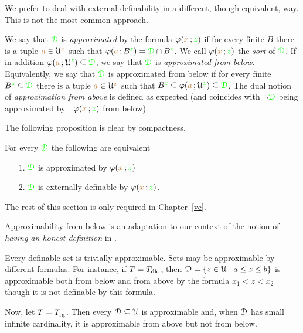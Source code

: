 \noindent\llap{\textcolor{red}{\Large\warning}\kern1.5ex}%
We prefer to deal with external definability in a different, though equivalent, way.
This is not the most common approach.

\begin{definition}\label{def_approx}
We say that ${\color{green}\EuScript D}$ is \emph{approximated\/} by the formula $\varphi({\color{brown} x}\,;{\color{green} z})$ if for every finite $B$ there is a tuple ${\color{brown} a}\in\EuScript U^{\color{brown} x}$ such that $\varphi({\color{brown} a}\,;B^{\color{green} z})={\color{green}\EuScript D}\cap B^{\color{green} z}$.
We call $\varphi({\color{brown} x}\,;{\color{green} z})$ the \emph{sort} of ${\color{green}\EuScript D}$.
If in addition $\varphi({\color{brown} a}\,;\EuScript U^{\color{green} z})\subseteq{\color{green}\EuScript D}$, we say that  ${\color{green}\EuScript D}$ is \emph{approximated from below}.
Equivalently, we say that  ${\color{green}\EuScript D}$ is approximated from below if for every finite $B^{\color{green} z}\subseteq{\color{green}\EuScript D}$ there is a tuple ${\color{brown} a}\in\EuScript U^{\color{brown} x}$ such that  $B^{\color{green} z}\subseteq\varphi({\color{brown} a}\,;\EuScript U^{\color{green} z})\subseteq{\color{green}\EuScript D}$.
The dual notion of \emph{approximation from above\/} is defined as expected (and coincides with $\neg{\color{green}\EuScript D}$ being approximated by $\neg\varphi({\color{brown} x}\,;{\color{green} z})$ from below).
\end{definition} 

The following proposition is clear by compactness.

\begin{proposition}\label{prop_approx=external}
   For every ${\color{green}\EuScript D}$ the following are equivalent
   \begin{itemize}
   \item[1.] ${\color{green}\EuScript D}$ is approximated by $\varphi({\color{brown} x}\,;{\color{green} z})$
   \item[2.] ${\color{green}\EuScript D}$ is externally definable by $\varphi({\color{brown} x}\,;{\color{green} z})$.
   \end{itemize}
\end{proposition}

The rest of this section is only required in Chapter~\ref{vc}.

Approximability from below is an adaptation to our context of the notion of \textit{having an honest definition} in \cite{CS}.

\begin{example}
Every definable set is trivially approximable.
Sets may be approximable by different formulas.
For instance, if $T=T_{\rm dlo}$, then $\EuScript D=\{z\in\EuScript U:a\le z\le b\}$ is approximable both from below and from above by the formula $x_1<z<x_2$ though it is not definable by this formula.

Now, let $T=T_{\rm rg}$.
Then every $\EuScript D\subseteq\EuScript U$ is approximable and, when $\EuScript D$ has small infinite cardinality, it is approximable from above but not from below.
\end{example}

